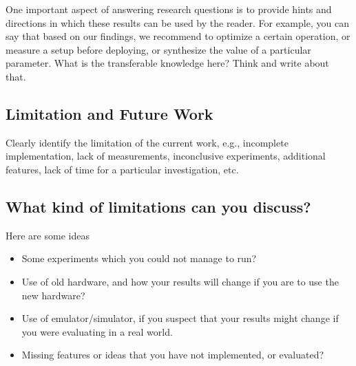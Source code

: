One important aspect of answering research questions is to provide hints and directions in which these results can be used by the reader. For example, you can say that based on our findings, we recommend to optimize a certain operation, or measure a setup before deploying, or synthesize the value of a particular parameter. What is the transferable knowledge here? Think and write about that. 
\subsection{Limitation and Future Work}
Clearly identify the limitation of the current work, e.g., incomplete implementation, lack of measurements, inconclusive experiments, additional features, lack of time for a particular investigation, etc. 

\subsection*{What kind of limitations can you discuss?}
Here are some ideas 
\begin{itemize}
 \item Some experiments which you could not manage to run?
 \item Use of old hardware, and how your results will change if you are to use the new hardware?
 \item Use of emulator/simulator, if you suspect that your results might change if you were evaluating in a real world. 
 \item Missing features or ideas that you have not implemented, or evaluated? 
\end{itemize}
